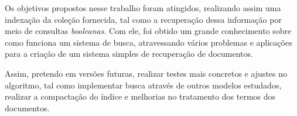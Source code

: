 \documentclass[12pt]{article}
\begin{document}
Os objetivos propostos nesse trabalho foram atingidos, realizando assim uma indexação da coleção fornecida, tal como a recuperação dessa informação por meio de consultas \textit{booleanas}. Com ele, foi obtido um grande conhecimento sobre como funciona um sistema de busca, atravessando vários problemas e aplicações para a criação de um sistema simples de recuperação de documentos.

Assim, pretendo em versões futuras, realizar testes mais concretos e ajustes no algoritmo, tal como implementar busca através de outros modelos estudados, realizar a compactação do índice e melhorias no tratamento dos termos dos documentos.


\nocite{*}
\end{document}
